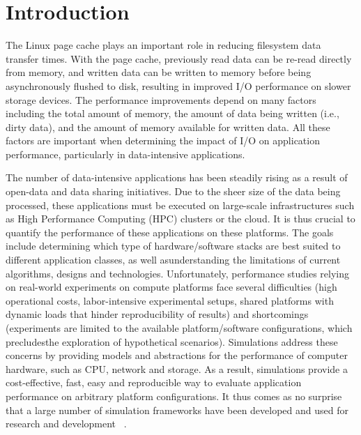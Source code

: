 \chapter{Introduction}

The Linux page cache plays an important role in reducing filesystem data 
transfer times. With the page cache, previously read data can be re-read 
directly from memory, and written data can be written to memory before 
being asynchronously flushed to disk, resulting in improved I/O performance
on slower storage devices. The performance improvements depend on many 
factors including the total amount of memory, the amount of data being 
written (i.e., dirty data), and the amount of memory available for
written data. All these factors are important when determining the impact 
of I/O on application performance, particularly in data-intensive applications.

The number of data-intensive applications has been steadily rising as a result of
open-data and data sharing initiatives. Due to the sheer size of the data being
processed, these applications must be executed on large-scale infrastructures
such as High Performance Computing (HPC) clusters or the cloud.  
It is thus crucial to quantify the performance of these applications
on these platforms. The goals include determining which type of hardware/software
stacks are best suited to different application classes, as well asunderstanding 
the limitations of current algorithms, designs and technologies. 
Unfortunately, performance studies relying on real-world experiments on 
compute platforms face several difficulties (high operational costs, 
labor-intensive experimental setups, shared platforms with dynamic loads 
that hinder reproducibility of results) and shortcomings
(experiments are limited to the available platform/software configurations, 
which precludesthe exploration of hypothetical scenarios). 
Simulations address these concerns by providing models and abstractions 
for the performance of computer hardware, such as CPU, network and storage. 
As a result, simulations provide a cost-effective, fast, easy and reproducible 
way to evaluate application performance on arbitrary platform configurations. 
It thus comes as no surprise that a large number of simulation frameworks 
have been developed and used for research and development
~\cite{ optorsim, gridsim, groudsim, cloudsim, nunez2012simcan,
nunez2012icancloud, mdcsim, dissect_cf, cloudnetsimplusplus, fognetsimplusplus, casanova2014simgrid, ROSS, casanova2020fgcs}. 

